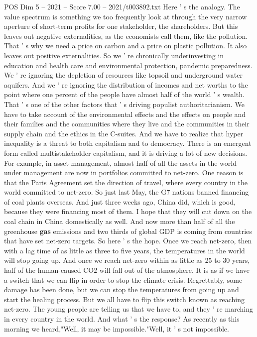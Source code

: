 \begin{textsample}{POS Dim 5 – 2021 – Score 7.00 – 2021/t003892.txt}
Here ' s the analogy.
The value spectrum is something we too frequently look at through the very narrow aperture of short-term profits for one stakeholder, the shareholders.
But this leaves out negative externalities, as the economists call them, like the pollution.
That ' s why we need a price on carbon and a price on plastic pollution.
It also leaves out positive externalities.
So we ' re chronically underinvesting in education and health care and environmental protection, pandemic preparedness.
We ' re ignoring the depletion of resources like topsoil and underground water aquifers.
And we ' re ignoring the distribution of incomes and net worths to the point where one percent of the people have almost half of the world ' s wealth.
That ' s one of the other factors that ' s driving populist authoritarianism.
We have to take account of the environmental effects and the effects on people and their families and the communities where they live and the communities in their supply chain and the ethics in the C-suites.
And we have to realize that hyper inequality is a threat to both capitalism and to democracy.
There is an emergent form called multistakeholder capitalism, and it is driving a lot of new decisions.
For example, in asset management, almost half of all the assets in the world under management are now in portfolios committed to net-zero.
One reason is that the Paris Agreement set the direction of travel, where every country in the world committed to net-zero.
So just last May, the G7 nations banned financing of coal plants overseas.
And just three weeks ago, China did, which is good, because they were financing most of them.
I hope that they will cut down on the coal chain in China domestically as well.
And now more than half of all the greenhouse \textbf{gas} emissions and two thirds of global GDP is coming from countries that have set net-zero targets.
So here ' s the hope.
Once we reach net-zero, then with a lag time of as little as three to five years, the temperatures in the world will stop going up.
And once we reach net-zero within as little as 25 to 30 years, half of the human-caused CO2 will fall out of the atmosphere.
It is as if we have a switch that we can flip in order to stop the climate crisis.
Regrettably, some damage has been done, but we can stop the temperatures from going up and start the healing process.
But we all have to flip this switch known as reaching net-zero.
The young people are telling us that we have to, and they ' re marching in every country in the world.
And what ' s the response?
As recently as this morning we heard,"Well, it may be impossible."Well, it ' s not impossible.

\end{textsample}
